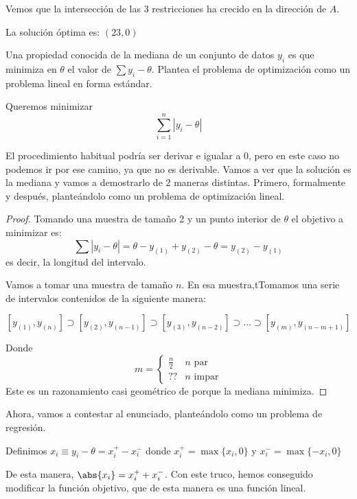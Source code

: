 \begin{problem}[5]
Vemos que la intersección de las 3 restricciones ha crecido en la dirección de $A$.

La solución óptima es: $\left(23,0\right)$

\end{problem}


\begin{problem}[9]

Una propiedad conocida de la mediana de un conjunto de datos $y_i$ es que minimiza en $\theta$ el valor de $\sum y_i-\theta$. Plantea el problema de optimización como un problema lineal en forma estándar.
\solution

Queremos minimizar 
\[\sum_{i=1}^n |y_i - \theta|\]

El procedimiento habitual podría ser derivar e igualar a 0, pero en este caso no podemos ir por ese camino, ya que no es derivable.
Vamos a ver que la solución es la mediana y vamos a demostrarlo de 2 maneras distintas. 
Primero, formalmente y después, planteándolo como un problema de optimización lineal.

\begin{proof}

Tomando una muestra de tamaño 2 y un punto interior de $\theta$ el objetivo a minimizar es:
\[\sum |y_i - \theta| = \theta - y_{(1)} + y_{(2)}-\theta = y_{(2)} - y_{(1)}\]
es decir, la longitud del intervalo.

Vamos a tomar una muestra de tamaño $n$. 
En esa muestra,tTomamos una serie de intervalos contenidos de la siguiente manera:

\[ [y_{(1)},y_{(n)}] \supset  [y_{(2)},y_{(n-1)}] \supset [y_{(3)},y_{(n-2)}] \supset ... \supset [y_{(m)},y_{(n-m+1)}]\]

Donde \[m=\left\{ \begin{array}{cc} \frac{n}{2} & n\text{ par}\\ ?? & n\text{ impar} \end{array}\right.\]
Este es un razonamiento casi geométrico de porque la mediana minimiza.
\end{proof}


Ahora, vamos a contestar al enunciado, planteándolo como un problema de regresión.

Definimos $x_i \equiv y_i - \theta = x_i^+ - x_i^-$ donde $x_i^+ = \max\{x_i,0\}$ y $x_i^- = \max\{-x_i,0\}$

De esta manera, $\abs{x_i} = x_i^+ + x_i^-$. Con este truco, hemos conseguido modificar la función objetivo, que de esta manera es una función lineal.


\end{problem}
